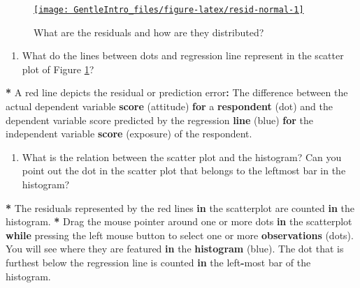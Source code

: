 \documentclass[a4paper]{book}
\newenvironment{Shaded}{\begin{snugshade}}{\end{snugshade}}
\newcommand{\KeywordTok}[1]{\textcolor[rgb]{0,0,0}{\textbf{#1}}}
\newcommand{\StringTok}[1]{\textcolor[rgb]{0.00,0.00,0.00}{#1}}
\newcommand{\ControlFlowTok}[1]{\textcolor[rgb]{0.00,0.00,0.00}{\textbf{#1}}}
\newcommand{\OperatorTok}[1]{\textcolor[rgb]{0.00,0.00,0.00}{\textbf{#1}}}
\newcommand{\NormalTok}[1]{#1}
\providecommand{\tightlist}{%
  \setlength{\itemsep}{0pt}\setlength{\parskip}{0pt}}
\theoremstyle{definition}
\theoremstyle{definition}
\theoremstyle{definition}
\theoremstyle{remark}
\begin{document}
\begin{figure}[H]
\href{http://82.196.4.233:3838/apps/resid-normal/}{\texttt{[image: GentleIntro\_files/figure-latex/resid-normal-1]} }\caption{What are the residuals and how are they distributed?}\label{fig:resid-normal}
\end{figure}

\begin{enumerate}
\def\labelenumi{\arabic{enumi}.}
\tightlist
\item
  What do the lines between dots and regression line represent in the
  scatter plot of Figure \ref{fig:resid-normal}?
\end{enumerate}

\begin{Shaded}
\begin{Highlighting}[]
\OperatorTok{*}\StringTok{ }\NormalTok{A red line depicts the residual or prediction error}\OperatorTok{:}\StringTok{ }\NormalTok{The difference between}
\NormalTok{the actual dependent variable }\KeywordTok{score}\NormalTok{ (attitude) }\ControlFlowTok{for}\NormalTok{ a }\KeywordTok{respondent}\NormalTok{ (dot) and the}
\NormalTok{dependent variable score predicted by the regression }\KeywordTok{line}\NormalTok{ (blue) }\ControlFlowTok{for}\NormalTok{ the}
\NormalTok{independent variable }\KeywordTok{score}\NormalTok{ (exposure) of the respondent.}
\end{Highlighting}
\end{Shaded}

\begin{enumerate}
\def\labelenumi{\arabic{enumi}.}
\setcounter{enumi}{1}
\tightlist
\item
  What is the relation between the scatter plot and the histogram? Can
  you point out the dot in the scatter plot that belongs to the leftmost
  bar in the histogram?
\end{enumerate}

\begin{Shaded}
\begin{Highlighting}[]
\OperatorTok{*}\StringTok{ }\NormalTok{The residuals represented by the red lines }\ControlFlowTok{in}\NormalTok{ the scatterplot are counted }\ControlFlowTok{in}
\NormalTok{the histogram.}
\OperatorTok{*}\StringTok{ }\NormalTok{Drag the mouse pointer around one or more dots }\ControlFlowTok{in}\NormalTok{ the scatterplot }\ControlFlowTok{while}
\NormalTok{pressing the left mouse button to select one or more }\KeywordTok{observations}\NormalTok{ (dots). You}
\NormalTok{will see where they are featured }\ControlFlowTok{in}\NormalTok{ the }\KeywordTok{histogram}\NormalTok{ (blue). The dot that is}
\NormalTok{furthest below the regression line is counted }\ControlFlowTok{in}\NormalTok{ the left}\OperatorTok{-}\NormalTok{most bar of the}
\NormalTok{histogram.}
\end{Highlighting}
\end{Shaded}
\end{document}
